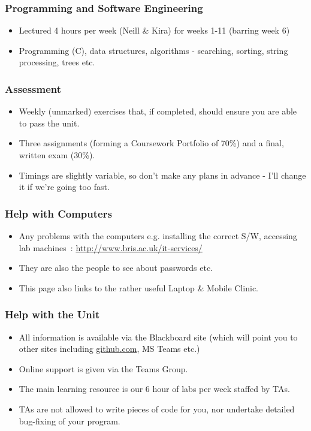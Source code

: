\begin{frame}%
\frametitle{Programming and Software Engineering}
\begin{itemize}[<+->]
\item Lectured 4 hours per week (Neill \& Kira) for weeks 1-11 (barring week 6)
\item Programming (C), data structures, algorithms - searching, sorting, string processing, trees etc.
\end{itemize}
\end{frame}

\begin{frame}%
\frametitle{Assessment}
\begin{itemize}[<+->]
\item Weekly (unmarked) exercises that, if completed, should ensure you are able to pass the unit.
\item Three assignments (forming a Coursework Portfolio of 70\%) and a final, written exam (30\%).
\item Timings are slightly variable, so don't make any plans in advance -
I'll change it if we're going too fast.
\end{itemize}
\end{frame}


\begin{frame}%
\frametitle{Help with Computers}
\begin{itemize}[<+->]
\item Any problems with the computers e.g. installing the correct S/W, accessing lab machines~: \url{http://www.bris.ac.uk/it-services/}
\item They are also the people to see about passwords etc.
\item This page also links to the rather useful Laptop \& Mobile Clinic.
\end{itemize}
\end{frame}

\begin{frame}%
\frametitle{Help with the Unit}
\begin{itemize}[<+->]
\item All information is available via the Blackboard site (which will point you to other sites including \url{github.com}, MS Teams etc.)
\item Online support is given via the Teams Group.
\item The main learning resource is our 6 hour of labs per week staffed by TAs.
\item TAs are not allowed to write pieces of code for you,
nor undertake detailed bug-fixing of your program.
\end{itemize}
\end{frame}
